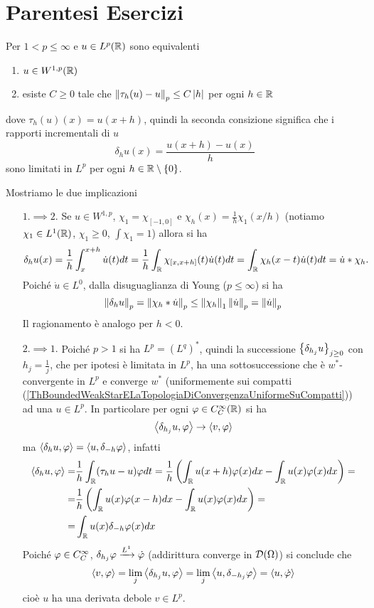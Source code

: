 \section{Parentesi Esercizi}
\begin{exercise}
Per $1<p\leq \infty$ e $u\in L^p(\mathbb{R})$ sono equivalenti
\begin{enumerate}
    \item $u\in W^{1,p}(\mathbb{R})$
    \item esiste $C\geq 0$ tale che $\left\Vert{\tau_h(u)-u}\right\Vert_p\leq C\left|{h}\right|$ per ogni $h\in \mathbb{R}$
\end{enumerate}
dove $\tau_h(u)(x)=u(x+h)$, quindi la seconda consizione significa che i rapporti incrementali di $u$
\[\delta_hu(x)=\frac{u(x+h)-u(x)}h\]
sono limitati in $L^p$ per ogni $h\in \mathbb{R}\setminus\{0\}$.
\end{exercise}
\begin{solution}
Mostriamo le due implicazioni
\setlength{\leftmargini}{0cm}
\begin{itemize}
\item[$\boxed{1.\implies2.}$] Se $u\in W^{1,p}$, $\chi_1=\chi_{[-1,0]}$ e $\chi_h(x)=\frac1h\chi_1(x/h)$ (notiamo $\chi_1\in L^1(\mathbb{R})$, $\chi_1\geq 0$, $\int \chi_1=1$) allora si ha
\[\delta_hu(x)=\frac1h\int_x^{x+h}\dot u(t)dt=\frac1h\int_{\mathbb{R}}\chi_{[x,x+h]}(t)\dot u(t)dt=\int_{\mathbb{R}}\chi_{h}(x-t)\dot u(t)dt=\dot u\ast\chi_h.\]
Poich\'e $\dot u\in L^0$, dalla disuguaglianza di Young ($p\leq \infty$) si ha
\[\left\Vert{\delta_h u}\right\Vert_p=\left\Vert{\chi_h\ast\dot u}\right\Vert_p\leq \left\Vert{\chi_h}\right\Vert_1\left\Vert{\dot u}\right\Vert_p=\left\Vert{\dot u}\right\Vert_p\]
Il ragionamento \`e analogo per $h<0$.
\item[$\boxed{2.\implies1.}$] Poich\'e $p>1$ si ha $L^p=(L^q)^\ast$, quindi la successione $\left\{{\delta_{h_j}u}\right\}_{j\geq 0}$ con $h_j=\frac1j$, che per ipotesi \`e limitata in $L^p$, ha una sottosuccessione che \`e $w^\ast$-convergente in $L^p$ e converge $w^\ast$ (uniformemente sui compatti (\ref{ThBoundedWeakStarELaTopologiaDiConvergenzaUniformeSuCompatti})) ad una $u\in L^p$. In particolare per ogni $\varphi\in C^\infty_C(\mathbb{R})$ si ha
\[\left\langle {\delta_{h_j}u,\varphi}\right\rangle\to \left\langle {v,\varphi}\right\rangle\]
ma $\left\langle {\delta_hu,\varphi}\right\rangle=\left\langle {u,\delta_{-h}\varphi}\right\rangle$, infatti
\begin{align*}
    \left\langle {\delta_hu,\varphi}\right\rangle=&\frac1h\int_{\mathbb{R}}(\tau_h u-u)\varphi dt=\frac1h\left({\int_{\mathbb{R}} u(x+h)\varphi(x)dx-\int_{\mathbb{R}} u(x)\varphi(x)dx}\right)=\\
    =&\frac1h\left({\int_{\mathbb{R}} u(x)\varphi(x-h)dx-\int_{\mathbb{R}} u(x)\varphi(x)dx}\right)=\\
    =&\int_{\mathbb{R}} u(x)\delta_{-h}\varphi(x) dx
\end{align*}
Poich\'e $\varphi\in C^\infty_C$, $\delta_{h_j}\varphi\xrightarrow{L^1}\dot {\varphi}$ (addirittura converge in $\mathcal{D}(\Omega)$) si conclude che
\[\left\langle {v,\varphi}\right\rangle=\lim_j\left\langle {\delta_{h_j}u,\varphi}\right\rangle=\lim_j\left\langle {u,\delta_{-h_j}\varphi}\right\rangle=\left\langle {u,\dot {\varphi}}\right\rangle\]
cio\`e $u$ ha una derivata debole $v\in L^p$.
\end{itemize}
\setlength{\leftmargini}{0.5cm}
\end{solution}
